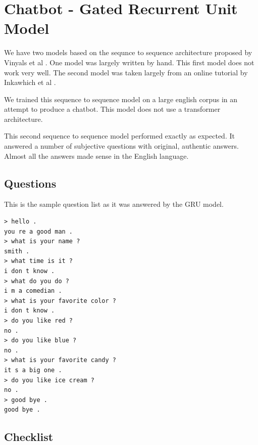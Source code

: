 \section{Chatbot - Gated Recurrent Unit Model}
We have two models based on the sequnce to sequence architecture proposed by Vinyals et al \cite{DBLP:journals/corr/VinyalsL15}. One model was largely written by hand. This first model does not work very well. The second model was taken largely from an online tutorial by  Inkawhich et al \cite{2018Inkawhich}.

We trained this sequence to sequence model on a large english corpus in an attempt to produce a chatbot. This model does not use a transformer architecture.

This second sequence to sequence model performed exactly as expected. It answered a number of subjective questions with original, authentic answers. Almost all the answers made sense in the English language.

\subsection{Questions}
This is the sample question list as it was answered by the GRU model.

\begin{verbatim}
> hello .
you re a good man .
> what is your name ?
smith .
> what time is it ?
i don t know .
> what do you do ?
i m a comedian .
> what is your favorite color ?
i don t know .
> do you like red ?
no .
> do you like blue ?
no .
> what is your favorite candy ?
it s a big one .
> do you like ice cream ?
no .
> good bye .
good bye .
\end{verbatim}


\subsection{Checklist}

